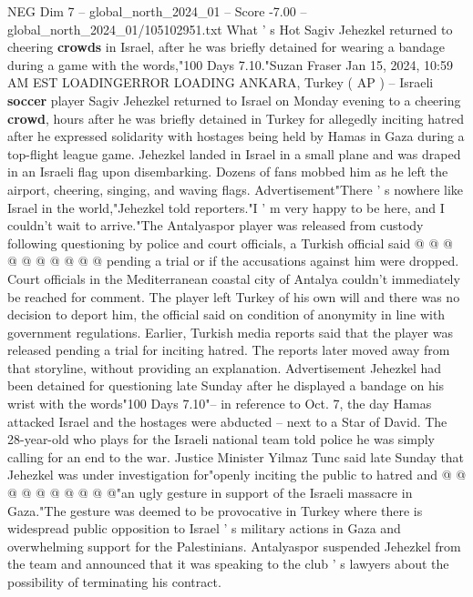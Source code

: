 \begin{textsample}{NEG Dim 7 – global\_north\_2024\_01 – Score -7.00 – global\_north\_2024\_01/105102951.txt}  \label{ex:f7_neg_210}
What ' s Hot Sagiv Jehezkel returned to cheering \textbf{crowds} in Israel, after he was briefly detained for wearing a bandage during a game with the words,"100 Days 7.10."Suzan Fraser Jan 15, 2024, 10:59 AM EST LOADINGERROR LOADING ANKARA, Turkey ( AP ) -- Israeli \textbf{soccer} player Sagiv Jehezkel returned to Israel on Monday evening to a cheering \textbf{crowd}, hours after he was briefly detained in Turkey for allegedly inciting hatred after he expressed solidarity with hostages being held by Hamas in Gaza during a top-flight league game.
Jehezkel landed in Israel in a small plane and was draped in an Israeli flag upon disembarking.
Dozens of fans mobbed him as he left the airport, cheering, singing, and waving flags.
Advertisement"There ' s nowhere like Israel in the world,"Jehezkel told reporters."I ' m very happy to be here, and I couldn't wait to arrive."The Antalyaspor player was released from custody following questioning by police and court officials, a Turkish official said @ @ @ @ @ @ @ @ @ @ pending a trial or if the accusations against him were dropped.
Court officials in the Mediterranean coastal city of Antalya couldn't immediately be reached for comment.
The player left Turkey of his own will and there was no decision to deport him, the official said on condition of anonymity in line with government regulations.
Earlier, Turkish media reports said that the player was released pending a trial for inciting hatred.
The reports later moved away from that storyline, without providing an explanation.
Advertisement Jehezkel had been detained for questioning late Sunday after he displayed a bandage on his wrist with the words"100 Days 7.10"-- in reference to Oct. 7, the day Hamas attacked Israel and the hostages were abducted -- next to a Star of David.
The 28-year-old who plays for the Israeli national team told police he was simply calling for an end to the war.
Justice Minister Yilmaz Tunc said late Sunday that Jehezkel was under investigation for"openly inciting the public to hatred and @ @ @ @ @ @ @ @ @ @"an ugly gesture in support of the Israeli massacre in Gaza."The gesture was deemed to be provocative in Turkey where there is widespread public opposition to Israel ' s military actions in Gaza and overwhelming support for the Palestinians.
Antalyaspor suspended Jehezkel from the team and announced that it was speaking to the club ' s lawyers about the possibility of terminating his contract.

\end{textsample}
